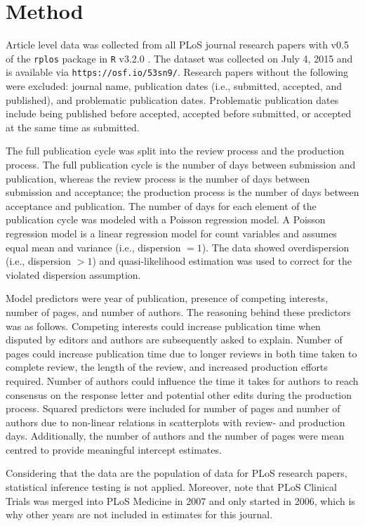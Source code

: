 \section*{Method}
Article level data was collected from all PLoS journal research papers with v0.5 of the \texttt{rplos} package \cite{rplos} in \texttt{R} v3.2.0 \cite{rcran}. The dataset was collected on July 4, 2015 and is available via \texttt{https://osf.io/53sn9/}. Research papers without the following were excluded: journal name, publication dates (i.e., submitted, accepted, and published), and problematic publication dates. Problematic publication dates include being published before accepted, accepted before submitted, or accepted at the same time as submitted.

The full publication cycle was split into the review process and the production process. The full publication cycle is the number of days between submission and publication, whereas the review process is the number of days between submission and acceptance; the production process is the number of days between acceptance and publication. The number of days for each element of the publication cycle was modeled with a Poisson regression model. A Poisson regression model is a linear regression model for count variables and assumes equal mean and variance (i.e., dispersion $=1$). The data showed overdispersion (i.e., dispersion $>1$) and quasi-likelihood estimation was used to correct for the violated dispersion assumption.

Model predictors were year of publication, presence of competing interests, number of pages, and number of authors. The reasoning behind these predictors was as follows. Competing interests could increase publication time when disputed by editors and authors are subsequently asked to explain. Number of pages could increase publication time due to longer reviews in both time taken to complete review, the length of the review, and increased production efforts required. Number of authors could influence the time it takes for authors to reach consensus on the response letter and potential other edits during the production process. Squared predictors were included for number of pages and number of authors due to non-linear relations in scatterplots with review- and production days. Additionally, the number of authors and the number of pages were mean centred to provide meaningful intercept estimates.

Considering that the data are the population of data for PLoS research papers, statistical inference testing is not applied. Moreover, note that PLoS Clinical Trials was merged into PLoS Medicine in 2007 and only started in 2006, which is why other years are not included in estimates for this journal.
  